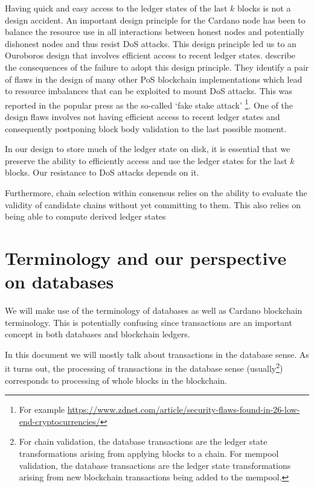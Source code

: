 \documentclass[11pt,a4paper]{article}
\begin{document}
Having quick and easy access to the ledger states of the last $k$ blocks is not
a design accident. An important design principle for the Cardano node has been
to balance the resource use in all interactions between honest nodes and
potentially dishonest nodes and thus resist DoS attacks. This design principle
led us to an Ouroboros design that involves efficient access to recent ledger
states. \citet{fake-stake} describe the consequences of the failure to adopt
this design principle. They identify a pair of flaws in the design of many
other PoS blockchain implementations which lead to resource imbalances that can
be exploited to mount DoS attacks. This was reported in the popular press as
the so-called `fake stake attack'%
\footnote{For example \url{https://www.zdnet.com/article/security-flaws-found-in-26-low-end-cryptocurrencies/}}.
One of the design flaws involves not having efficient access to recent ledger
states and consequently postponing block body validation to the last possible
moment.

In our design to store much of the ledger state on disk, it is essential that we
preserve the ability to efficiently access and use the ledger states for the
last $k$ blocks. Our resistance to DoS attacks depends on it.

Furthermore, chain selection within consensus relies on the ability to evaluate
the validity of candidate chains without yet committing to them. This also
relies on being able to compute derived ledger states

\section{Terminology and our perspective on databases}
\label{terminology}

We will make use of the terminology of databases as well as Cardano blockchain
terminology. This is potentially confusing since transactions are an important
concept in both databases and blockchain ledgers.

In this document we will mostly talk about transactions in the database sense.
As it turns out, the processing of transactions in the database sense
(usually\footnote{For chain validation, the database transactions are the ledger
state transformations arising from applying blocks to a chain. For mempool
validation, the database transactions are the ledger state transformations
arising from new blockchain transactions being added to the mempool.})
corresponds to processing of whole blocks in the blockchain.
\end{document}
